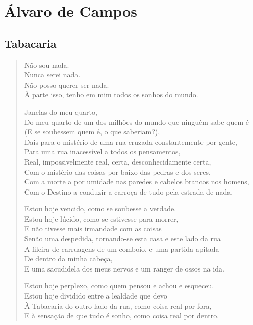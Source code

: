 \documentclass[10pt,a5paper,oneside]{book}
\begin{document}
\part{Álvaro de Campos}

\chapter{Tabacaria}

\begin{verse}
Não sou nada.\\
Nunca serei nada.\\
Não posso querer ser nada.\\
À parte isso, tenho em mim todos os sonhos do mundo.

Janelas do meu quarto,\\
Do meu quarto de um dos milhões do mundo que ninguém sabe quem é\\
(E se soubessem quem é, o que saberiam?),\\
Dais para o mistério de uma rua cruzada constantemente por gente,\\
Para uma rua inacessível a todos os pensamentos,\\
Real, impossivelmente real, certa, desconhecidamente certa,\\
Com o mistério das coisas por baixo das pedras e dos seres,\\
Com a morte a por umidade nas paredes e cabelos brancos nos homens,\\
Com o Destino a conduzir a carroça de tudo pela estrada de nada.

Estou hoje vencido, como se soubesse a verdade.\\
Estou hoje lúcido, como se estivesse para morrer,\\
E não tivesse mais irmandade com as coisas\\
Senão uma despedida, tornando-se esta casa e este lado da rua\\
A fileira de carruagens de um comboio, e uma partida apitada\\
De dentro da minha cabeça,\\
E uma sacudidela dos meus nervos e um ranger de ossos na ida.

Estou hoje perplexo, como quem pensou e achou e esqueceu.\\
Estou hoje dividido entre a lealdade que devo\\
À Tabacaria do outro lado da rua, como coisa real por fora,\\
E à sensação de que tudo é sonho, como coisa real por dentro.


\end{verse}
\end{document}
